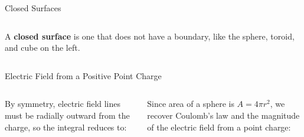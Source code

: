 \documentclass[12pt,aspectratio=169]{beamer}
\begin{document}
\begin{frame}{Closed Surfaces}
  \begin{columns}
    A \textbf{closed surface} is one that does not have a boundary, like the
    sphere, toroid, and cube on the left.
  \end{columns}
\end{frame}



\begin{frame}{Electric Field from a Positive Point Charge}
  \begin{columns}
    
    By symmetry, electric field lines must be radially outward from the charge,
    so the integral reduces to:


    Since area of a sphere is $A=4\pi r^2$, we recover Coulomb's law and the
    magnitude of the electric field from a point charge:

  \end{columns}
\end{frame}
\end{document}
